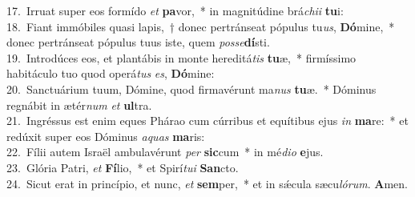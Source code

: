 {17.~}Irruat super eos formído \textit{et} \textbf{pa}vor,~* in magnitúdine brá\textit{chi}\textit{i} \textbf{tu}i:\\
{18.~}Fiant immóbiles quasi lapis,~† donec pertránseat pópulus tu\textit{us}, \textbf{Dó}mine,~* donec pertránseat pópulus tuus iste, quem \textit{pos}\textit{se}\textbf{dí}sti.\\
{19.~}Introdúces eos, et plantábis in monte hereditá\textit{tis} \textbf{tu}æ,~* firmíssimo habitáculo tuo quod operá\textit{tus} \textit{es}, \textbf{Dó}mine:\\
{20.~}Sanctuárium tuum, Dómine, quod firmavérunt ma\textit{nus} \textbf{tu}æ.~* Dóminus regnábit in ætér\textit{num} \textit{et} \textbf{ul}tra.\\
{21.~}Ingréssus est enim eques Phárao cum cúrribus et equítibus ejus \textit{in} \textbf{ma}re:~* et redúxit super eos Dóminus \textit{a}\textit{quas} \textbf{ma}ris:\\
{22.~}Fílii autem Israël ambulavérunt \textit{per} \textbf{sic}cum~* in mé\textit{di}\textit{o} \textbf{e}jus.\\
{23.~}Glória Patri, \textit{et} \textbf{Fí}lio,~* et Spirí\textit{tu}\textit{i} \textbf{San}cto.\\
{24.~}Sicut erat in princípio, et nunc, \textit{et} \textbf{sem}per,~* et in sǽcula sæcu\textit{ló}\textit{rum}. \textbf{A}men.\\
